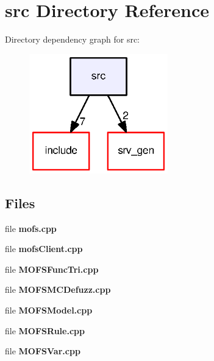 \section{src Directory Reference}
\label{dir_68267d1309a1af8e8297ef4c3efbcdba}
Directory dependency graph for src\-:\nopagebreak
\begin{figure}[H]
\begin{center}
\leavevmode
\includegraphics[width=170pt]{dir_68267d1309a1af8e8297ef4c3efbcdba_dep}
\end{center}
\end{figure}
\subsection*{Files}
\begin{DoxyCompactItemize}
\item 
file {\bf mofs.\-cpp}
\item 
file {\bf mofs\-Client.\-cpp}
\item 
file {\bf M\-O\-F\-S\-Func\-Tri.\-cpp}
\item 
file {\bf M\-O\-F\-S\-M\-C\-Defuzz.\-cpp}
\item 
file {\bf M\-O\-F\-S\-Model.\-cpp}
\item 
file {\bf M\-O\-F\-S\-Rule.\-cpp}
\item 
file {\bf M\-O\-F\-S\-Var.\-cpp}
\end{DoxyCompactItemize}
